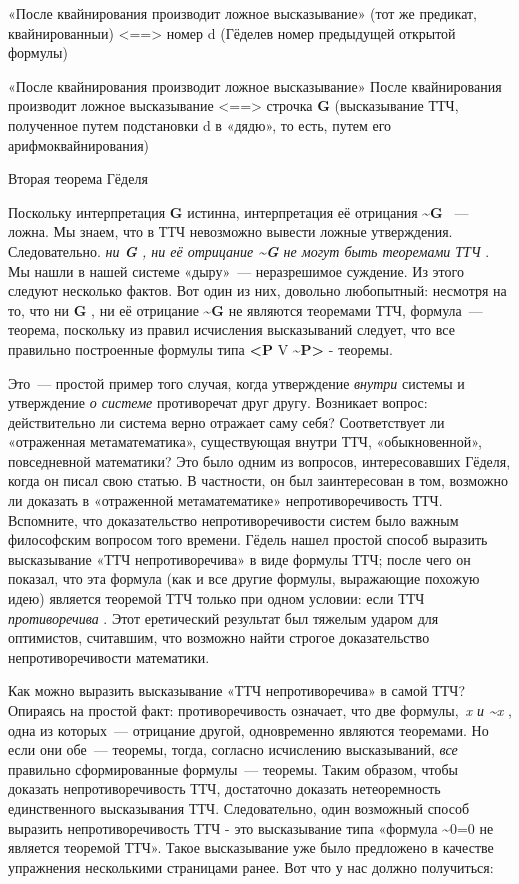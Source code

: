 \documentclass[../main.tex]{subfiles}
\begin{document}
«После квайнирования производит ложное высказывание» (тот же предикат, квайнированныи) \textless==\textgreater{} номер d (Гёделев номер предыдущей открытой формулы)

«После квайнирования производит ложное высказывание» После квайнирования производит ложное высказывание \textless==\textgreater{} строчка \textbf{G} (высказывание ТТЧ, полученное путем подстановки d в «дядю», то есть, путем его арифмоквайнирования)

Вторая теорема Гёделя

Поскольку интерпретация \textbf{G} истинна, интерпретация её отрицания \textbf{\textasciitilde G} ~--- ложна. Мы знаем, что в ТТЧ невозможно вывести ложные утверждения. Следовательно. \emph{ни \textbf{G} , ни её отрицание \textbf{\textasciitilde G} не могут быть теоремами ТТЧ} . Мы нашли в нашей системе «дыру»~--- неразрешимое суждение. Из этого следуют несколько фактов. Вот один из них, довольно любопытный: несмотря на то, что ни \textbf{G} , ни её отрицание \textbf{\textasciitilde G} не являются теоремами ТТЧ, формула~--- теорема, поскольку из правил исчисления высказываний следует, что все правильно построенные формулы типа \textbf{\textless P} V \textbf{\textasciitilde P\textgreater{}} - теоремы.

Это~--- простой пример того случая, когда утверждение \emph{внутри} системы и утверждение \emph{о системе} противоречат друг другу. Возникает вопрос: действительно ли система верно отражает саму себя? Соответствует ли «отраженная метаматематика», существующая внутри ТТЧ, «обыкновенной», повседневной математики? Это было одним из вопросов, интересовавших Гёделя, когда он писал свою статью. В частности, он был заинтересован в том, возможно ли доказать в «отраженной метаматематике» непротиворечивость ТТЧ. Вспомните, что доказательство непротиворечивости систем было важным философским вопросом того времени. Гёдель нашел простой способ выразить высказывание «ТТЧ непротиворечива» в виде формулы ТТЧ; после чего он показал, что эта формула (как и все другие формулы, выражающие похожую идею) является теоремой ТТЧ только при одном условии: если ТТЧ \emph{противоречива} . Этот еретический результат был тяжелым ударом для оптимистов, считавшим, что возможно найти строгое доказательство непротиворечивости математики.

Как можно выразить высказывание «ТТЧ непротиворечива» в самой ТТЧ? Опираясь на простой факт: противоречивость означает, что две формулы,~\emph{x и \textasciitilde x} , одна из которых~--- отрицание другой, одновременно являются теоремами. Но если они обе~--- теоремы, тогда, согласно исчислению высказываний, \emph{все} правильно сформированные формулы~--- теоремы. Таким образом, чтобы доказать непротиворечивость ТТЧ, достаточно доказать нетеоремность единственного высказывания ТТЧ. Следовательно, один возможный способ выразить непротиворечивость ТТЧ - это высказывание типа «формула \textasciitilde0=0 не является теоремой ТТЧ». Такое высказывание уже было предложено в качестве упражнения несколькими страницами ранее. Вот что у нас должно получиться:
\end{document}
